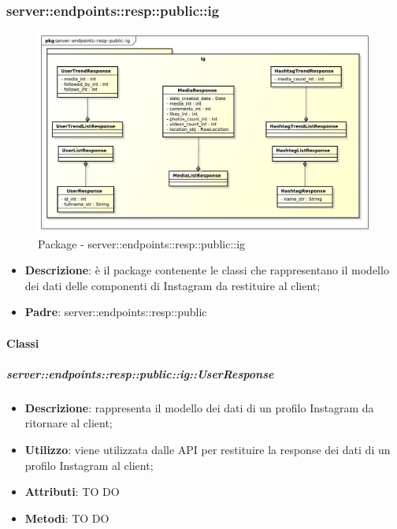 \subsubsection{server::endpoints::resp::public::ig} %
\label{ssub:bdsm_app_server_endpoints_resp_public_ig}
\begin{figure}[!htbp]
	\centering
	\centerline{\includegraphics[scale=0.5]{./images/server/resp_ig.pdf}}
	\caption{Package - server::endpoints::resp::public::ig}
\end{figure}

\begin{itemize}
  \item \textbf{Descrizione}: è il package contenente le classi che rappresentano il modello dei dati delle componenti di Instagram da restituire al client;
  \item \textbf{Padre}: server::endpoints::resp::public
\end{itemize}

	\paragraph{Classi} %

    \subparagraph{server::endpoints::resp::public::ig::UserResponse} %
    \label{subp:bdsm_app_server_endpoints_resp_public_ig_userresponse}
    \begin{itemize}
      \item \textbf{Descrizione}: rappresenta il modello dei dati di un profilo Instagram da ritornare al client;
      \item \textbf{Utilizzo}: viene utilizzata dalle API per restituire la response dei dati di un profilo Instagram al client;
      
	  \item \textbf{Attributi}: TO DO
	  \item \textbf{Metodi}: TO DO
      \end{itemize}

